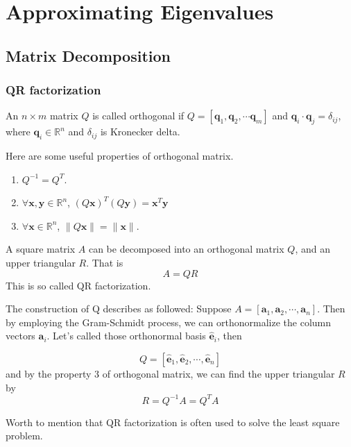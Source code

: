\chapter{Approximating Eigenvalues}
\section{Matrix Decomposition}
\subsection{QR factorization}
\begin{definition}
	An $n\times m$ matrix $Q$ is called orthogonal if $Q =[\mathbf{q}_1, \mathbf{q}_2,\cdots \mathbf{q}_m]$ and $\mathbf{q}_i\cdot\mathbf{q}_j = \delta_{ij}$, where $\mathbf{q}_i\in\mathbb{R}^n$ and $\delta_{ij}$ is Kronecker delta.
\end{definition}

\begin{property}
	Here are some useful properties of orthogonal matrix.
	\begin{enumerate}
		\item $Q^{-1} = Q^T$.
		\item $\forall \mathbf{x},\mathbf{y}\in\mathbb{R}^n$, $(Q\mathbf{x})^T(Q\mathbf{y}) = \mathbf{x}^T\mathbf{y}$
		\item $\forall \mathbf{x}\in\mathbb{R}^n$, $\| Q\mathbf{x} \| = \|\mathbf{x}\|$.
	\end{enumerate}
\end{property}
\begin{thm} [QR factorization]
	A square matrix $A$ can be decomposed into an orthogonal matrix $Q$, and an upper triangular $R$. That is 
	\[ A = QR \]
	This is so called QR factorization.
	
	The construction of Q describes as followed:
	Suppose $A = [\mathbf{a}_1, \mathbf{a}_2, \cdots, \mathbf{a}_n]$. Then by employing the Gram-Schmidt process, we can orthonormalize the column vectors $\mathbf{a}_i$. Let's called those orthonormal basis $\mathbf{\hat{e}}_i$, then
	
	\[ Q = [\mathbf{\hat{e}}_1, \mathbf{\hat{e}}_2, \cdots, \mathbf{\hat{e}}_n] \]
	and by the property 3 of orthogonal matrix, we can find the upper triangular $R$ by
	\[ R = Q^{-1}A = Q^TA \]
\end{thm}
Worth to mention that QR factorization is often used to solve the least square problem.


